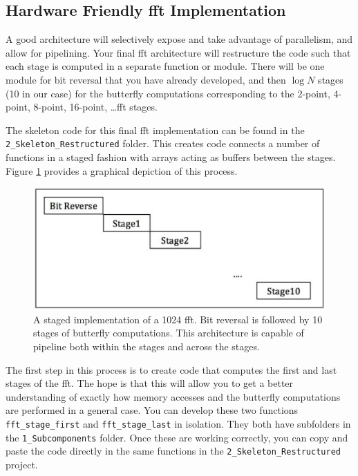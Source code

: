 \subsection{Hardware Friendly \gls{fft} Implementation}

A good architecture will selectively expose and take advantage of parallelism, and allow for pipelining. Your final \gls{fft} architecture will restructure the code such that each stage is computed in a separate function or module. There will be one module for bit reversal that you have already developed, and then $\log N$ stages (10 in our case) for the butterfly computations corresponding to the 2-point, 4-point, 8-point, 16-point, \dots \gls{fft} stages.

The skeleton code for this final \gls{fft} implementation can be found in the \texttt{2\_Skeleton\_Restructured} folder. This creates code connects a number of functions in a staged fashion with arrays acting as buffers between the stages. Figure \ref{fig:staged_fft} provides a graphical depiction of this process.

\begin{figure}
\centering
\includegraphics[width=5.5in]{images/staged_fft}
\caption{A staged implementation of a 1024 \gls{fft}. Bit reversal is followed by 10 stages of butterfly computations. This architecture is capable of pipeline both within the stages and across the stages.}
\label{fig:staged_fft}
\end{figure}

The first step in this process is to create code that computes the first and last stages of the \gls{fft}. The hope is that this will allow you to get a better understanding of exactly how memory accesses and the butterfly computations are performed in a general case. You can develop these two functions \texttt{fft\_stage\_first} and \texttt{fft\_stage\_last} in isolation. They both have subfolders in the \texttt{1\_Subcomponents} folder. Once these are working correctly, you can copy and paste the code directly in the same functions in the \texttt{2\_Skeleton\_Restructured} project.

